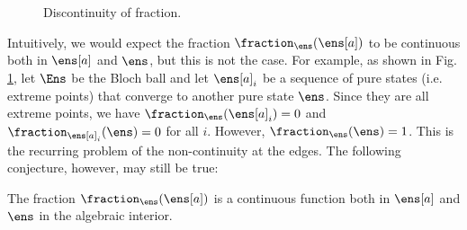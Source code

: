 \begin{figure}[H]
	\centering
	\caption{Discontinuity of fraction.}\label{pm-es-fig-fractionDiscontinuous}
\end{figure}

Intuitively, we would expect the fraction $\fraction_{\ens}(\ens[a])$ to be continuous both in $\ens[a]$ and $\ens$, but this is not the case. For example, as shown in Fig. \ref{pm-es-fig-fractionDiscontinuous}, let $\Ens$ be the Bloch ball and let $\ens[a]_i$ be a sequence of pure states (i.e. extreme points) that converge to another pure state $\ens$. Since they are all extreme points, we have $\fraction_{\ens}(\ens[a]_i) = 0$ and $\fraction_{\ens[a]_i}(\ens) = 0$ for all $i$. However, $\fraction_{\ens}(\ens) = 1$. This is the recurring problem of the non-continuity at the edges. The following conjecture, however, may still be true:
\begin{conj}
	The fraction $\fraction_{\ens}(\ens[a])$ is a continuous function both in $\ens[a]$ and $\ens$ in the algebraic interior.
\end{conj}


